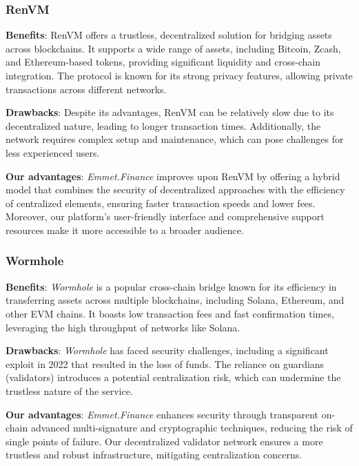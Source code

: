 \documentclass[12pt, a4paper]{article}
\begin{document}
\subsubsection{RenVM}

\textbf{Benefits}: RenVM offers a trustless, decentralized solution for bridging assets across blockchains. It supports a wide range of assets, including Bitcoin, Zcash, and Ethereum-based tokens, providing significant liquidity and cross-chain integration. The protocol is known for its strong privacy features, allowing private transactions across different networks.

\textbf{Drawbacks}: Despite its advantages, RenVM can be relatively slow due to its decentralized nature, leading to longer transaction times. Additionally, the network requires complex setup and maintenance, which can pose challenges for less experienced users.

\textbf{Our advantages}: \textit{Emmet.Finance} improves upon RenVM by offering a hybrid model that combines the security of decentralized approaches with the efficiency of centralized elements, ensuring faster transaction speeds and lower fees. Moreover, our platform's user-friendly interface and comprehensive support resources make it more accessible to a broader audience.

\subsubsection{Wormhole}

\textbf{Benefits}: \textit{Wormhole} is a popular cross-chain bridge known for its efficiency in transferring assets across multiple blockchains, including Solana, Ethereum, and other EVM chains. It boasts low transaction fees and fast confirmation times, leveraging the high throughput of networks like Solana.

\textbf{Drawbacks}: \textit{Wormhole} has faced security challenges, including a significant exploit in 2022 that resulted in the loss of funds. The reliance on guardians (validators) introduces a potential centralization risk, which can undermine the trustless nature of the service.

\textbf{Our advantages}: \textit{Emmet.Finance} enhances security through transparent on-chain advanced multi-signature and cryptographic techniques, reducing the risk of single points of failure. Our decentralized validator network ensures a more trustless and robust infrastructure, mitigating centralization concerns.
\end{document}
